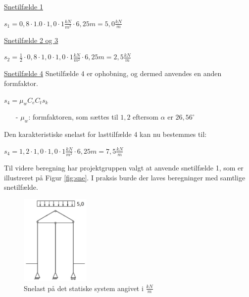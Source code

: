 \underline{Snetilfælde 1}
\begin{center}
$s_1=0,\!8\cdot 1.0\cdot 1,\!0\cdot 1 \frac{kN}{m^2}\cdot 6,\!25 m=5,\!0 \frac{kN}{m}$
\end{center}
\underline{Snetilfælde 2 og 3}
\begin{center}
$s_2=\frac{1}{2}\cdot 0,\!8\cdot 1,\!0\cdot 1,\!0\cdot 1 \frac{kN}{m^2}\cdot 6,\!25 m=2,\!5 \frac{kN}{m}$
\end{center}
\underline{Snetilfælde 4}
\newline
\newline
Snetilfælde 4 er ophobning, og dermed anvendes en anden formfaktor.
\begin{center}
	$s_4=\mu_wC_eC_ts_k$
\end{center}
\begin{itemize}
	\item[-] $\mu_w$: formfaktoren, som sættes til $1,\!2$ eftersom $\alpha$ er $26,\!56^{\circ}$ \citep[ kapitel 5.3.3]{EU91}
\end{itemize}
Den karakteristiske snelast for lasttilfælde 4 kan nu bestemmes til:
\begin{center}
	$s_4=1,\!2\cdot 1,\!0\cdot 1,\!0\cdot 1 \frac{kN}{m^2}\cdot 6,\!25 m = 7,\!5 \frac{kN}{m}$
\end{center}
Til videre beregning har projektgruppen valgt at anvende snetilfælde 1, som er illustreret på Figur \ref{fig:sne}. I praksis burde der laves beregninger med samtlige snetilfælde.

\begin{figure}[H]
	\centering
	\includegraphics[width=0.3\textwidth]{billeder/snelast.png}
	\caption{Snelast på det statiske system angivet i $\frac{kN}{m}$}
	\label{fig:snelast}
\end{figure}

